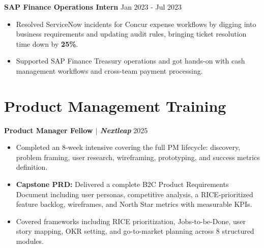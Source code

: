 \documentclass[10pt]{article}
\newcommand{\subheading}[2]{
  \textbf{#1} \hfill #2 \\[-4pt]
}
\begin{document}
\vspace{4pt}
\subheading{SAP Finance Operations Intern}{Jan 2023 - Jul 2023}
\vspace{-8pt}
\begin{itemize}
  \item Resolved ServiceNow incidents for Concur expense workflows by digging into business requirements and updating audit rules,
  bringing ticket resolution time down by \textbf{25\%}.
  \item Supported SAP Finance Treasury operations and got hands-on with cash management workflows and cross-team payment
  processing.
\end{itemize}

\section*{Product Management Training}
\textbf{Product Manager Fellow $|$ \textit{Nextleap}} \hfill 2025 \\[-4pt]
\vspace{-10pt}
\begin{itemize}
  \item Completed an 8-week intensive covering the full PM lifecycle: discovery, problem framing, user research, wireframing,
  prototyping, and success metrics definition.
  \item \textbf{Capstone PRD:} Delivered a complete B2C Product Requirements Document including user personas, competitive analysis, a
  RICE-prioritized feature backlog, wireframes, and North Star metrics with measurable KPIs.
  \item Covered frameworks including RICE prioritization, Jobs-to-be-Done, user story mapping, OKR setting, and go-to-market
  planning across 8 structured modules.
\end{itemize}
\end{document}
